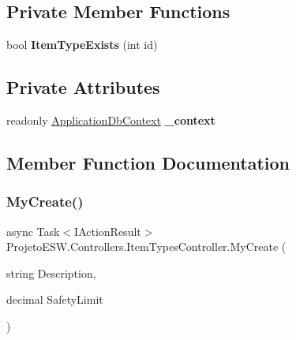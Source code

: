 \subsection*{Private Member Functions}
\begin{DoxyCompactItemize}
\item 
\mbox{\label{class_projeto_e_s_w_1_1_controllers_1_1_item_types_controller_a8988b6074e38285eec68a515a7876a54}} 
bool {\bfseries Item\+Type\+Exists} (int id)
\end{DoxyCompactItemize}
\subsection*{Private Attributes}
\begin{DoxyCompactItemize}
\item 
\mbox{\label{class_projeto_e_s_w_1_1_controllers_1_1_item_types_controller_a5346f8d1acfbd271e04ca301839cec05}} 
readonly \mbox{\hyperlink{class_projeto_e_s_w_1_1_data_1_1_application_db_context}{Application\+Db\+Context}} {\bfseries \+\_\+context}
\end{DoxyCompactItemize}


\subsection{Member Function Documentation}
\mbox{\label{class_projeto_e_s_w_1_1_controllers_1_1_item_types_controller_a45e2aad98ceab787f05483c05173046b}} 
\subsubsection{\texorpdfstring{My\+Create()}{MyCreate()}}
{\footnotesize\ttfamily async Task$<$I\+Action\+Result$>$ Projeto\+E\+S\+W.\+Controllers.\+Item\+Types\+Controller.\+My\+Create (\begin{DoxyParamCaption}\item[{string}]{Description,  }\item[{decimal}]{Safety\+Limit }\end{DoxyParamCaption})}



